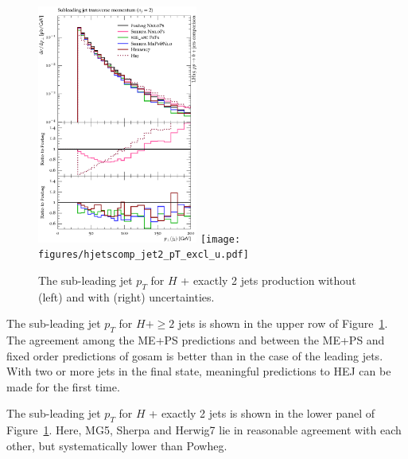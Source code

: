 \begin{figure}[t!]
  \centering
  \includegraphics[width=0.47\textwidth]{figures/hjetscomp_u_jet2_pT_excl.pdf}
  \hfill
  \texttt{[image: figures/hjetscomp\_jet2\_pT\_excl\_u.pdf]}
  \caption{
    The sub-leading jet $p_T$ for $H$ + exactly 2 jets production without
    (left) and with (right) uncertainties.
    \label{fig:higgscomp:results:2obs:jet2_pt}
  }
\end{figure}

The sub-leading jet $p_T$ for $H+\ge2$ jets is shown in the upper row
of Figure~\ref{fig:higgscomp:results:2obs:jet2_pt}.  The agreement
among the ME+PS predictions and between the ME+PS and fixed order
predictions of gosam is better than in the case of the leading
jets. With two or more jets in the final state, meaningful predictions
to HEJ can be made for the first time.

The sub-leading jet $p_T$ for $H$ + exactly 2 jets is shown in the
lower panel of Figure~\ref{fig:higgscomp:results:2obs:jet2_pt}.
Here, MG5, Sherpa and Herwig7 lie in reasonable agreement with each
other, but systematically lower than Powheg.



